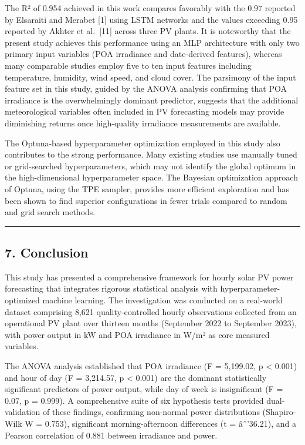 \documentclass[
  11pt,
]{article}
\begin{document}
The R² of 0.954 achieved in this work compares favorably with the 0.97
reported by Elsaraiti and Merabet {[}1{]} using LSTM networks and the
values exceeding 0.95 reported by Akhter et al.~{[}11{]} across three PV
plants. It is noteworthy that the present study achieves this
performance using an MLP architecture with only two primary input
variables (POA irradiance and date-derived features), whereas many
comparable studies employ five to ten input features including
temperature, humidity, wind speed, and cloud cover. The parsimony of the
input feature set in this study, guided by the ANOVA analysis confirming
that POA irradiance is the overwhelmingly dominant predictor, suggests
that the additional meteorological variables often included in PV
forecasting models may provide diminishing returns once high-quality
irradiance measurements are available.

The Optuna-based hyperparameter optimization employed in this study also
contributes to the strong performance. Many existing studies use
manually tuned or grid-searched hyperparameters, which may not identify
the global optimum in the high-dimensional hyperparameter space. The
Bayesian optimization approach of Optuna, using the TPE sampler,
provides more efficient exploration and has been shown to find superior
configurations in fewer trials compared to random and grid search
methods.

\begin{center}\rule{0.5\linewidth}{0.5pt}\end{center}

\subsection{7. Conclusion}\label{conclusion}

This study has presented a comprehensive framework for hourly solar PV
power forecasting that integrates rigorous statistical analysis with
hyperparameter-optimized machine learning. The investigation was
conducted on a real-world dataset comprising 8,621 quality-controlled
hourly observations collected from an operational PV plant over thirteen
months (September 2022 to September 2023), with power output in kW and
POA irradiance in W/m² as core measured variables.

The ANOVA analysis established that POA irradiance (F = 5,199.02, p
\textless{} 0.001) and hour of day (F = 3,214.57, p \textless{} 0.001)
are the dominant statistically significant predictors of power output,
while day of week is insignificant (F = 0.07, p = 0.999). A
comprehensive suite of six hypothesis tests provided dual-validation of
these findings, confirming non-normal power distributions (Shapiro-Wilk
W = 0.753), significant morning-afternoon differences (t = âˆ’36.21),
and a Pearson correlation of 0.881 between irradiance and power.
\end{document}
